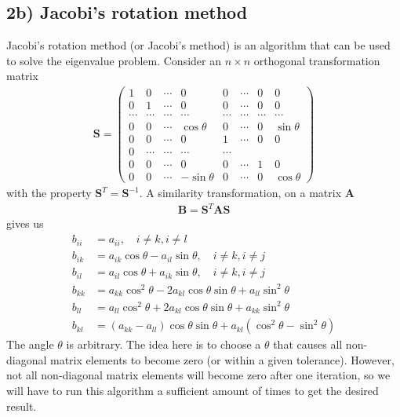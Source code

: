 \documentclass[12pt]{article}
\begin{document}
\subsection*{2b) Jacobi's rotation method}
Jacobi's rotation method (or Jacobi's method) is an algorithm that can be used to solve the eigenvalue problem. Consider an $n\times n$ orthogonal transformation matrix
\begin{align}
\mathbf{S} = \begin{pmatrix}
1 & 0 & \cdots & 0 & 0 & \cdots & 0 & 0 \\
0 & 1 & \cdots & 0 & 0 & \cdots & 0 & 0 \\
\cdots & \cdots & \cdots & \cdots &\cdots & \cdots & \cdots & \cdots \\
0 & 0& \cdots & \cos \theta & 0 & \cdots & 0 & \sin \theta \\
0 & 0 & \cdots & 0 & 1 & \cdots & 0 & 0 \\
0 & \cdots & \cdots & \cdots & \cdots \\
0 & 0 & \cdots & 0 & 0 & \cdots & 1 & 0 \\
0 & 0 & \cdots & -\sin\theta & 0 & \cdots & 0 & \cos\theta
\end{pmatrix}
\end{align}
with the property $\mathbf{S}^T = \mathbf{S}^{-1}$. A similarity transformation, on a matrix $\mathbf{A}$
\begin{align}
\mathbf{B} = \mathbf{S}^T \mathbf{A} \mathbf{S}
\end{align}
gives us 
\begin{align}
b_{ii} &= a_{ii} ,\quad i\neq k, i\neq l \\
b_{ik} &= a_{ik} \cos\theta - a_{il}\sin\theta, \quad i\neq k, i\neq j \\
b_{il} &= a_{il}\cos\theta + a_{ik}\sin\theta, \quad i\neq k, i\neq j \\
b_{kk} &= a_{kk}\cos^2\theta - 2a_{kl}\cos\theta\sin\theta + a_{ll}\sin^2\theta \\
b_{ll} &= a_{ll}\cos^2\theta + 2a_{kl}\cos\theta\sin\theta + a_{kk}\sin^2\theta \\
b_{kl} &= (a_{kk}-a_{ll})\cos\theta\sin\theta + a_{kl}(\cos^2\theta - \sin^2\theta)
\end{align}
The angle $\theta$ is arbitrary. The idea here is to choose a $\theta$ that causes all non-diagonal matrix elements to become zero (or within a given tolerance). However, not all non-diagonal matrix elements will become zero after one iteration, so we will have to run this algorithm a sufficient amount of times to get the desired result.
\end{document}
